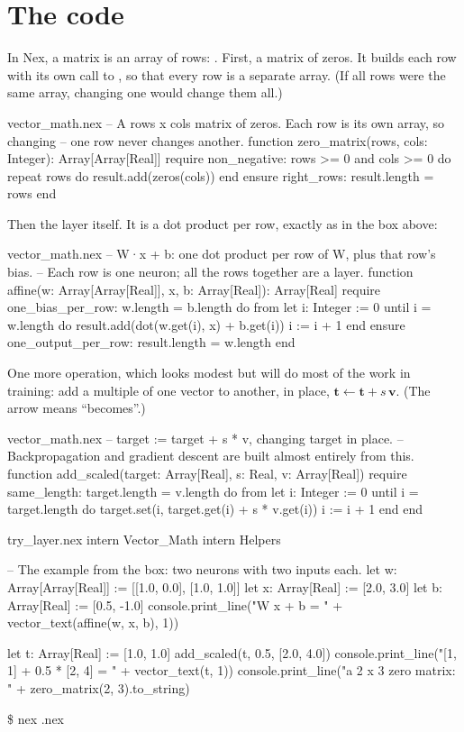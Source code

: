 \documentclass[11pt,a4paper,oneside,openany]{book}
\newcommand{\tryoutput}[1]{%
  \begin{tcolorbox}[outbox]
  {\ttfamily\footnotesize\color{outfg}\$ nex \detokenize{#1}.nex}\par\vspace{2pt}
  
  \end{tcolorbox}}
\newcommand{\code}[1]{\texttt{\detokenize{#1}}}
\newcommand{\vect}[1]{\mathbf{#1}}
\begin{document}
\section{The code}

In Nex, a matrix is an array of rows: \code{Array[Array[Real]]}. First, a
matrix of zeros. It builds each row with its own call to \code{zeros}, so
that every row is a separate array. (If all rows were the same array,
changing one would change them all.)

\begin{append}{vector_math.nex}
-- A rows x cols matrix of zeros. Each row is its own array, so changing
-- one row never changes another.
function zero_matrix(rows, cols: Integer): Array[Array[Real]]
require
  non_negative: rows >= 0 and cols >= 0
do
  repeat rows do
    result.add(zeros(cols))
  end
ensure
  right_rows: result.length = rows
end
\end{append}

Then the layer itself. It is a dot product per row, exactly as in the box
above:

\begin{append}{vector_math.nex}
-- W·x + b: one dot product per row of W, plus that row's bias.
-- Each row is one neuron; all the rows together are a layer.
function affine(w: Array[Array[Real]], x, b: Array[Real]): Array[Real]
require
  one_bias_per_row: w.length = b.length
do
  from
    let i: Integer := 0
  until
    i = w.length
  do
    result.add(dot(w.get(i), x) + b.get(i))
    i := i + 1
  end
ensure
  one_output_per_row: result.length = w.length
end
\end{append}

One more operation, which looks modest but will do most of the work in
training: add a multiple of one vector to another, in place,
$\vect{t} \leftarrow \vect{t} + s\,\vect{v}$. (The arrow means ``becomes''.)

\begin{append}{vector_math.nex}
-- target := target + s * v, changing target in place.
-- Backpropagation and gradient descent are built almost entirely from this.
function add_scaled(target: Array[Real], s: Real, v: Array[Real])
require
  same_length: target.length = v.length
do
  from
    let i: Integer := 0
  until
    i = target.length
  do
    target.set(i, target.get(i) + s * v.get(i))
    i := i + 1
  end
end
\end{append}

\begin{tryit}{try_layer.nex}
intern Vector_Math
intern Helpers

-- The example from the box: two neurons with two inputs each.
let w: Array[Array[Real]] := [[1.0, 0.0], [1.0, 1.0]]
let x: Array[Real] := [2.0, 3.0]
let b: Array[Real] := [0.5, -1.0]
console.print_line("W x + b = " + vector_text(affine(w, x, b), 1))

let t: Array[Real] := [1.0, 1.0]
add_scaled(t, 0.5, [2.0, 4.0])
console.print_line("[1, 1] + 0.5 * [2, 4] = " + vector_text(t, 1))
console.print_line("a 2 x 3 zero matrix: " + zero_matrix(2, 3).to_string)
\end{tryit}
\tryoutput{try_layer}
\end{document}
